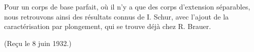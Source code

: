 Pour un corps de base parfait, où il n'y a que des corps d'extension séparables, nous retrouvons ainsi des résultats connus de I. Schur, avec l'ajout de la caractérisation par plongement, qui se trouve déjà chez R. Brauer.

\begin{center}
(Reçu le 8 juin 1932.)
\end{center}

\clearpage

\setcounter{footnote}{0}
